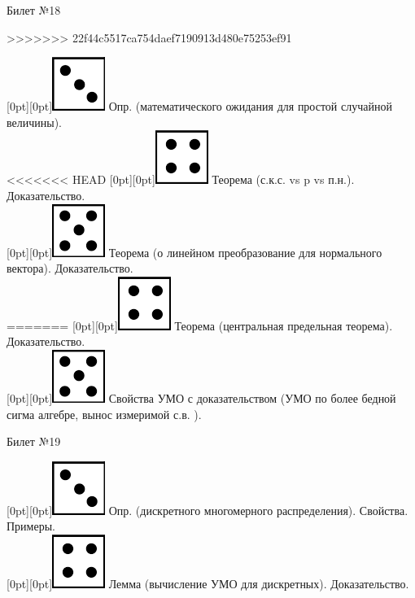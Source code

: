 \documentclass[10pt]{article}
\begin{document}
\begin{center} {\Large Билет №18} \end{center} 
>>>>>>> 22f44c5517ca754daef7190913d480e75253ef91

\raisebox{-1pt}[0pt][0pt]{\includegraphics[width=0.02\linewidth]{3.png}} Опр. (математического ожидания для простой случайной величины). \\

<<<<<<< HEAD
\raisebox{-1pt}[0pt][0pt]{\includegraphics[width=0.02\linewidth]{4.png}} Теорема (с.к.с. vs p vs п.н.). Доказательство. \\ 

\raisebox{-1pt}[0pt][0pt]{\includegraphics[width=0.02\linewidth]{5.png}} Теорема (о линейном преобразование для нормального вектора). Доказательство. \\
=======
\raisebox{-1pt}[0pt][0pt]{\includegraphics[width=0.02\linewidth]{4.png}} Теорема (центральная предельная теорема). Доказательство. \\        

\raisebox{-1pt}[0pt][0pt]{\includegraphics[width=0.02\linewidth]{5.png}} Свойства УМО с доказательством (УМО по более бедной сигма алгебре, вынос измеримой с.в. ). \\

\begin{center} {\Large Билет №19} \end{center} 

\raisebox{-1pt}[0pt][0pt]{\includegraphics[width=0.02\linewidth]{3.png}} Опр. (дискретного многомерного распределения). Свойства. Примеры. \\

\raisebox{-1pt}[0pt][0pt]{\includegraphics[width=0.02\linewidth]{4.png}} Лемма (вычисление УМО для дискретных). Доказательство. \\
\end{document}
